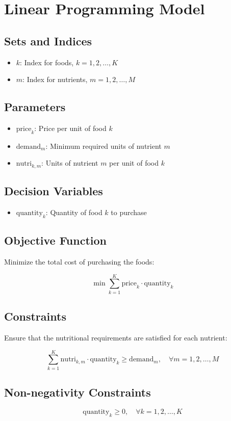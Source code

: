 \documentclass{article}
\begin{document}
\section*{Linear Programming Model}

\subsection*{Sets and Indices}
\begin{itemize}
    \item \( k \): Index for foods, \( k = 1, 2, \ldots, K \)
    \item \( m \): Index for nutrients, \( m = 1, 2, \ldots, M \)
\end{itemize}

\subsection*{Parameters}
\begin{itemize}
    \item \( \text{price}_k \): Price per unit of food \( k \)
    \item \( \text{demand}_m \): Minimum required units of nutrient \( m \)
    \item \( \text{nutri}_{k, m} \): Units of nutrient \( m \) per unit of food \( k \)
\end{itemize}

\subsection*{Decision Variables}
\begin{itemize}
    \item \( \text{quantity}_k \): Quantity of food \( k \) to purchase
\end{itemize}

\subsection*{Objective Function}
Minimize the total cost of purchasing the foods:

\[
\min \sum_{k=1}^{K} \text{price}_k \cdot \text{quantity}_k
\]

\subsection*{Constraints}
Ensure that the nutritional requirements are satisfied for each nutrient:

\[
\sum_{k=1}^{K} \text{nutri}_{k, m} \cdot \text{quantity}_k \geq \text{demand}_m, \quad \forall m = 1, 2, \ldots, M
\]

\subsection*{Non-negativity Constraints}
\[
\text{quantity}_k \geq 0, \quad \forall k = 1, 2, \ldots, K
\]
\end{document}
